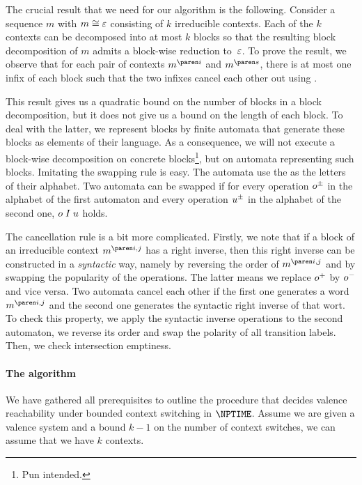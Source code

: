 \documentclass[../../diss.tex]{subfiles}
\begin{document}
The crucial result that we need for our algorithm is the following.
Consider a sequence $m$ with $m \cong \varepsilon$ consisting of $k$ irreducible contexts.
Each of the $k$ contexts can be decomposed into at most $k$ blocks so that the resulting block decomposition of $m$ admits a block-wise reduction to~$\varepsilon$.
To prove the result, we observe that for each pair of contexts $\itr{m}{i}$ and $\itr{m}{s}$, there is at most one infix of each block such that the two infixes cancel each other out using \RuleCancel.

This result gives us a quadratic bound on the number of blocks in a block decomposition, but it does not give us a bound on the length of each block.
To deal with the latter, we represent blocks by finite automata that generate these blocks as elements of their language.
As a consequence, we will not execute a block-wise decomposition on concrete blocks\footnote{Pun intended.}, but on automata representing such blocks.
Imitating the swapping rule is easy.
The automata use the  as the letters of their alphabet.
Two automata can be swapped if for every operation ${o}^\pm$ in the alphabet of the first automaton and every operation ${u}^\pm$ in the alphabet of the second one, $o \mathrel{I} u$ holds.

The cancellation rule is a bit more complicated.
Firstly, we note that if a block of an irreducible context $\itr{m}{i,j}$ has a right inverse, then this right inverse can be constructed in a \emph{syntactic} way, namely by reversing the order of $\itr{m}{i,j}$ and by swapping the popularity of the operations.
The latter means we replace ${o}^+$ by ${o}^-$ and vice versa.
Two automata cancel each other if the first one generates a word $\itr{m}{i,j}$ and the second one generates the syntactic right inverse of that wort.
To check this property, we apply the syntactic inverse operations to the second automaton, \ie we reverse its order and swap the polarity of all transition labels.
Then, we check intersection emptiness.

\paragraph{The algorithm}

We have gathered all prerequisites to outline the procedure that decides valence reachability under bounded context switching in $\NPTIME$.
Assume we are given a valence system and a bound $k-1$ on the number of context switches, \ie we can assume that we have $k$ contexts.
\end{document}
